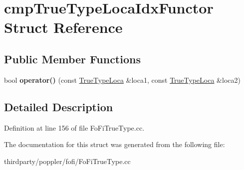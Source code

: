 \hypertarget{structcmp_true_type_loca_idx_functor}{}\section{cmp\+True\+Type\+Loca\+Idx\+Functor Struct Reference}
\label{structcmp_true_type_loca_idx_functor}
\subsection*{Public Member Functions}
\begin{DoxyCompactItemize}
\item 
\mbox{\label{structcmp_true_type_loca_idx_functor_a0be2eebdaf585b0c5a0969c6c8f72907}} 
bool {\bfseries operator()} (const \hyperlink{struct_true_type_loca}{True\+Type\+Loca} \&loca1, const \hyperlink{struct_true_type_loca}{True\+Type\+Loca} \&loca2)
\end{DoxyCompactItemize}


\subsection{Detailed Description}


Definition at line 156 of file Fo\+Fi\+True\+Type.\+cc.



The documentation for this struct was generated from the following file\+:\begin{DoxyCompactItemize}
\item 
thirdparty/poppler/fofi/Fo\+Fi\+True\+Type.\+cc\end{DoxyCompactItemize}
